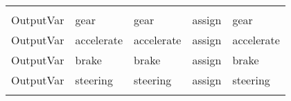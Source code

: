 \begin{tabularx}{\textwidth}{sssBs}
                       &       &       &       &  \\
                       OutputVar & gear  & gear  & assign & gear \\
                            OutputVar & accelerate & accelerate & assign & accelerate \\
                            OutputVar & brake & brake & assign & brake \\
                            OutputVar & steering & steering & assign & steering \\
                                  &       &       &       &  \\
          \bottomrule
     \end{tabularx}%